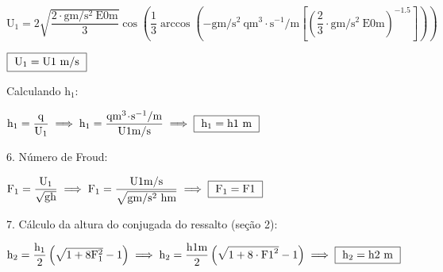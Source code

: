 \documentclass{article}
\newcommand{\myspace}{0.5cm}
\begin{document}
\begin{center}
	$
		\mathrm
		{
			U_{1}  =2\sqrt{\dfrac{2 \cdot {{g}}m/s^{2} \ {{E0}}m }{3}}\cos \! \left (\dfrac{1}{3}\arccos \! \left( - {{g}}m/s^{2} \ {{q}}m^{3} \! \cdot \! s^{-1}/m \left [\left ( \dfrac{2}{3}\cdot {{g}}m/s^{2} \ {{E0}}m \right )^{-1.5}  \right] \right ) \right)
		}
	$
\end{center}

\vspace{\myspace}

\begin{center}
	$
		\fbox
		{
			$
				\mathrm
				{
					U_{1}= {{U1}} \ m/s
				}
			$
		}
	$
\end{center}

\vspace{\myspace}

\newpage

Calculando $ \mathrm{h_{1}}$:

\vspace{\myspace}

\begin{center}
	$
		\mathrm
		{
			h_{1}= \dfrac{q}{U_{1}}
		} 
		\implies
		\mathrm
		{
			h_{1}= \dfrac{ {{q}} m^{3} \! \cdot \! s^{-1}/m}{ {{U1}} m/s}
		}
		\implies
		\fbox{ 
			$
				\mathrm
				{
					h_{1}= {{h1}} \ m
				}
			$  
		}
	$
\end{center}

\vspace{\myspace}

6. Número de Froud:	

\vspace{\myspace}

\begin{center}
	$
		\mathrm
		{
			F_{1} = \dfrac{U_{1}}{\sqrt{gh}}
		}
		\implies
		\mathrm
		{
			F_{1} = \dfrac{ {{U1}} m/s }{\sqrt{ {{g}} m/s^{2} \ {{h}}m }}
		}
		\implies 
		\fbox
		{
			$\mathrm
			{
				F_{1} = {{F1}} 
			}$
		}
	$  
\end{center}

\vspace{\myspace}

7. Cálculo da altura do conjugada do ressalto (seção 2):

\vspace{\myspace}

\begin{center}
	$
		\mathrm
		{
			h_{2} = \dfrac{h_{1}}{2}\left ( \sqrt{1+ 8F_{1}^{2}} - 1\right )
		}
		\implies 
		\mathrm
		{
			h_{2} = \dfrac{ {{h1}}m }{2}\left ( \sqrt{1+ 8\cdot {{F1}} ^{2}} - 1\right )
		}
		\implies 
		\fbox
		{
			$\mathrm
			{
				h_{2} = {{h2}} \ m
			}$
		}
	$
\end{center}
\end{document}
